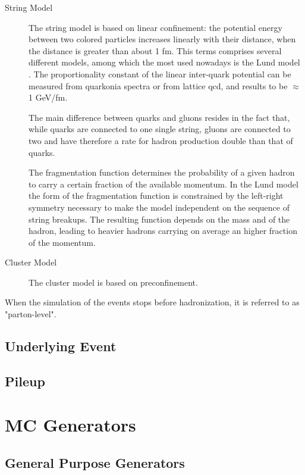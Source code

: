 \begin{description}
\item[String Model] The string model \cite{Artru:1974hr} is based on linear confinement: the potential energy between two colored particles increases linearly with their distance, when the distance is greater than about 1 fm. This terms comprises several different models, among which the most used nowadays is the Lund model \cite{Andersson:1983ia,Andersson:1998tv}. 
The proportionality constant of the linear inter-quark potential can be measured from quarkonia spectra or from lattice \gls{qcd}, and results to be $\approx$ 1 GeV/fm. 

The main difference between quarks and gluons resides in the fact that, while quarks are connected to one single string, gluons are connected to two and have therefore a rate for hadron production double than that of quarks. 


The fragmentation function determines the probability of a given hadron to carry a certain fraction of the available momentum. In the Lund model the form of the fragmentation function is constrained by the left-right symmetry necessary to make the model independent on the sequence of string breakups. The resulting function depends on the mass and \pt of the hadron, leading to heavier hadrons carrying on average an higher fraction of the momentum.

\item[Cluster Model] The cluster model is based on preconfinement. 
\end{description}

When the simulation of the events stops before hadronization, it is referred to as "parton-level".

\subsection{Underlying Event}

\subsection{Pileup}

\section{MC Generators}

\subsection{General Purpose Generators}

